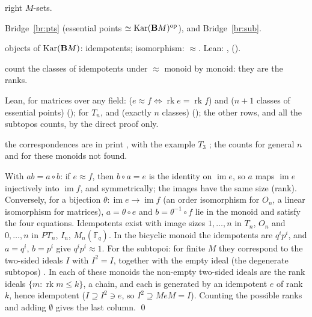 \begin{trace}
\item[deck] right $M$-sets.
\item[arch] Bridge~\ref{br:pts} (essential points $\simeq\operatorname{Kar}(\mathbf{B} M)^{\mathrm{op}}$), and Bridge~\ref{br:sub}.
\item[specialise] objects of $\operatorname{Kar}(\mathbf{B} M)$: idempotents; isomorphism: $\approx$. Lean: ,  ().
\item[rewrite] count the classes of idempotents under $\approx$ monoid by monoid: they are the ranks.
\item[verify] Lean, for matrices over any field:  ($e\approx f\iff\operatorname{rk}e=\operatorname{rk}f$) and  ($n+1$ classes of essential points) (); for $T_n$,  and  (exactly $n$ classes) (); the other rows, and all the subtopos counts, by the direct proof only.
\item[novelty] the correspondences are in print \cite{rogers-1905,pirashvili-jncg}, with the example $T_3$ \cite[Ex.~6.1.5]{pirashvili-jncg}; the counts for general $n$ and for these monoids not found.
\end{trace}

\direct{} With $ab = a\circ b$: if $e\approx f$, then $b\circ a = e$ is the identity on $\operatorname{im}e$, so $a$ maps $\operatorname{im}e$ injectively into $\operatorname{im}f$, and symmetrically; the images have the same size (rank). Conversely, for a bijection $\theta : \operatorname{im}e\to\operatorname{im}f$ (an order isomorphism for $O_n$, a linear isomorphism for matrices), $a = \theta\circ e$ and $b = \theta^{-1}\circ f$ lie in the monoid and satisfy the four equations. Idempotents exist with image sizes $1,\dots,n$ in $T_n$, $O_n$ and $0,\dots,n$ in $PT_n$, $I_n$, $M_n(\mathbb F_q)$. In the bicyclic monoid the idempotents are $q^ip^i$, and $a = q^i$, $b = p^i$ give $q^ip^i\approx 1$. For the subtopoi: for finite $M$ they correspond to the two-sided ideals $I$ with $I^2 = I$, together with the empty ideal (the degenerate subtopos) \cite[Prop.~6.1.2]{pirashvili-jncg}. In each of these monoids the non-empty two-sided ideals are the rank ideals $\{m : \operatorname{rk}m\le k\}$, a chain, and each is generated by an idempotent $e$ of rank $k$, hence idempotent ($I\supseteq I^2\ni e$, so $I^2\supseteq MeM = I$). Counting the possible ranks and adding $\emptyset$ gives the last column.
\qed

